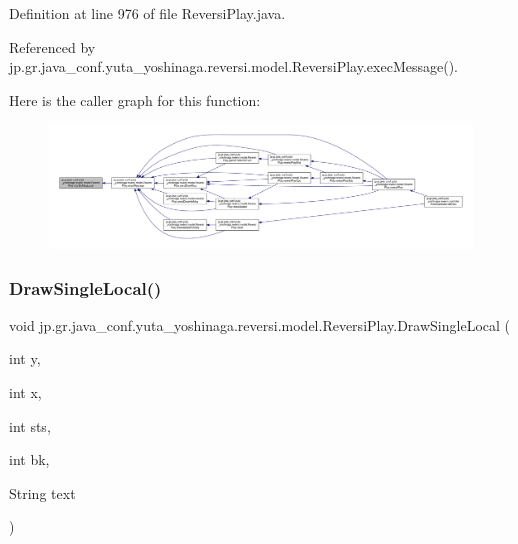 Definition at line 976 of file Reversi\+Play.\+java.



Referenced by jp.\+gr.\+java\+\_\+conf.\+yuta\+\_\+yoshinaga.\+reversi.\+model.\+Reversi\+Play.\+exec\+Message().

Here is the caller graph for this function\+:
\nopagebreak
\begin{figure}[H]
\begin{center}
\leavevmode
\includegraphics[width=350pt]{classjp_1_1gr_1_1java__conf_1_1yuta__yoshinaga_1_1reversi_1_1model_1_1_reversi_play_a4c4d14ddaf65d3643bd7edc7b562f4d1_icgraph}
\end{center}
\end{figure}
\mbox{\label{classjp_1_1gr_1_1java__conf_1_1yuta__yoshinaga_1_1reversi_1_1model_1_1_reversi_play_a0218c589d8567d52f92ab87bc4bec30f}} 
\subsubsection{\texorpdfstring{Draw\+Single\+Local()}{DrawSingleLocal()}}
{\footnotesize\ttfamily void jp.\+gr.\+java\+\_\+conf.\+yuta\+\_\+yoshinaga.\+reversi.\+model.\+Reversi\+Play.\+Draw\+Single\+Local (\begin{DoxyParamCaption}\item[{int}]{y,  }\item[{int}]{x,  }\item[{int}]{sts,  }\item[{int}]{bk,  }\item[{String}]{text }\end{DoxyParamCaption})\hspace{0.3cm}{\ttfamily [private]}}



